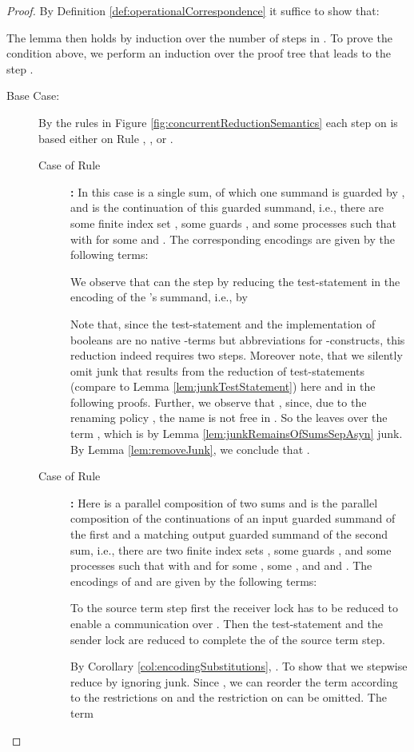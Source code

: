 \documentclass[]{llncs}
\begin{document}
\begin{proof}
	By Definition \ref{def:operationalCorrespondence} it suffice to show that:
	
	The lemma then holds by induction over the number of steps in . To prove the condition above, we perform an induction over the proof tree that leads to the step .
	\begin{description}
		\item[Base Case:] By the rules in Figure \ref{fig:concurrentReductionSemantics} each step on  is based either on Rule , , or .
			\begin{description}
				\item[Case of Rule] \textbf{:} In this case  is a single sum, of which one summand is guarded by , and  is the continuation of this  guarded summand, i.e., there are some finite index set , some guards , and some processes  such that  with  for some  and . The corresponding encodings are given by the following terms:
					
					We observe that  can \simulate the step  by reducing the test-statement in the encoding of the 's summand, i.e., by
					
					Note that, since the test-statement and the implementation of booleans are no native \piCal-terms but abbreviations for \piCal-constructs, this reduction indeed requires two steps. Moreover note, that we silently omit junk that results from the reduction of test-statements (compare to Lemma \ref{lem:junkTestStatement}) here and in the following proofs. Further, we observe that , since, due to the renaming policy , the name  is not free in . So the \simulation leaves over the term , which is by Lemma \ref{lem:junkRemainsOfSumsSepAsyn} junk. By Lemma \ref{lem:removeJunk}, we conclude that .
				\item[Case of Rule] \textbf{:} Here  is a parallel composition of two sums and  is the parallel composition of the continuations of an input guarded summand of the first and a matching output guarded summand of the second sum, i.e., there are two finite index sets , some guards , and some processes  such that  with  and  for some , some , and  and . The encodings of  and  are given by the following terms:
					
					To \simulate the source term step  first the receiver lock has to be reduced to enable a communication over . Then the test-statement and the sender lock are reduced to complete the \simulation of the source term step.
					
					
					By Corollary \ref{col:encodingSubstitutions}, . To show that  we stepwise reduce  by ignoring junk. Since , we can reorder the term according to the restrictions on  and the restriction on  can be omitted. The term
					

\end{description}
\end{description}
\end{proof}
\end{document}
